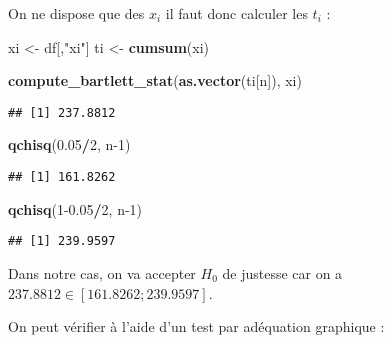 \documentclass[
]{article}
\newenvironment{Shaded}{\begin{snugshade}}{\end{snugshade}}
\newcommand{\DecValTok}[1]{\textcolor[rgb]{0.00,0.00,0.81}{#1}}
\newcommand{\FloatTok}[1]{\textcolor[rgb]{0.00,0.00,0.81}{#1}}
\newcommand{\FunctionTok}[1]{\textcolor[rgb]{0.13,0.29,0.53}{\textbf{#1}}}
\newcommand{\NormalTok}[1]{#1}
\newcommand{\OtherTok}[1]{\textcolor[rgb]{0.56,0.35,0.01}{#1}}
\newcommand{\SpecialCharTok}[1]{\textcolor[rgb]{0.81,0.36,0.00}{\textbf{#1}}}
\newcommand{\StringTok}[1]{\textcolor[rgb]{0.31,0.60,0.02}{#1}}
\begin{document}
On ne dispose que des \(x_i\) il faut donc calculer les \(t_i\) :

\begin{Shaded}
\begin{Highlighting}[]
\NormalTok{xi }\OtherTok{\textless{}{-}}\NormalTok{ df[,}\StringTok{"xi"}\NormalTok{]}
\NormalTok{ti }\OtherTok{\textless{}{-}} \FunctionTok{cumsum}\NormalTok{(xi)}
\end{Highlighting}
\end{Shaded}

\begin{Shaded}
\begin{Highlighting}[]
\FunctionTok{compute\_bartlett\_stat}\NormalTok{(}\FunctionTok{as.vector}\NormalTok{(ti[n]), xi)}
\end{Highlighting}
\end{Shaded}

\begin{verbatim}
## [1] 237.8812
\end{verbatim}

\begin{Shaded}
\begin{Highlighting}[]
\FunctionTok{qchisq}\NormalTok{(}\FloatTok{0.05}\SpecialCharTok{/}\DecValTok{2}\NormalTok{, n}\DecValTok{{-}1}\NormalTok{)}
\end{Highlighting}
\end{Shaded}

\begin{verbatim}
## [1] 161.8262
\end{verbatim}

\begin{Shaded}
\begin{Highlighting}[]
\FunctionTok{qchisq}\NormalTok{(}\DecValTok{1}\FloatTok{{-}0.05}\SpecialCharTok{/}\DecValTok{2}\NormalTok{, n}\DecValTok{{-}1}\NormalTok{)}
\end{Highlighting}
\end{Shaded}

\begin{verbatim}
## [1] 239.9597
\end{verbatim}

Dans notre cas, on va accepter \(H_0\) de justesse car on a
\(237.8812 \in [161.8262 ; 239.9597 ]\).

On peut vérifier à l'aide d'un test par adéquation graphique :
\end{document}
